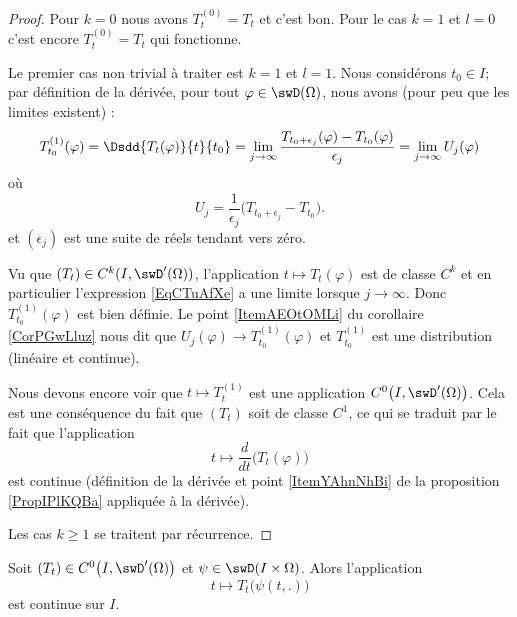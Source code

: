 \begin{proof}
    Pour \( k=0\) nous avons \( T^{(0)}_t=T_t\) et c'est bon. Pour le cas \( k=1\) et \( l=0\) c'est encore \( T_t^{(0)}=T_t\) qui fonctionne.

    Le premier cas non trivial à traiter est \( k=1\) et \( l=1\). Nous considérons \( t_0\in I\); par définition de la dérivée, pour tout \( \varphi\in\swD(\Omega)\), nous avons (pour peu que les limites existent) :
    \begin{equation}    \label{EqCTuAfXe}
        T^{(1)}_{t_0}(\varphi)=  \Dsdd{ T_t(\varphi) }{t}{t_0}=\lim_{j\to \infty} \frac{ T_{t_0+\epsilon_j}(\varphi)-T_{t_0}(\varphi) }{ \epsilon_j }= \lim_{j\to \infty} U_j(\varphi)
    \end{equation}
    où
    \begin{equation}
        U_j=\frac{1}{ \epsilon_j }\big( T_{t_0+\epsilon_j}-T_{t_0} \big).
    \end{equation}
    et \( (\epsilon_j)\) est une suite de réels tendant vers zéro.

    Vu que \( (T_t)\in C^k(I,\swD'(\Omega))\), l'application \( t\mapsto T_t(\varphi)\) est de classe \( C^k\) et en particulier l'expression \eqref{EqCTuAfXe} a une limite lorsque \( j\to \infty\). Donc \( T^{(1)}_{t_0}(\varphi)\) est bien définie. Le point \ref{ItemAEOtOMLi} du corollaire \ref{CorPGwLluz} nous dit que \( U_j(\varphi)\to T_{t_0}^{(1)}(\varphi)\) et \( T_{t_0}^{(1)}\) est une distribution (linéaire et continue).

    Nous devons encore voir que \( t\mapsto T^{(1)}_t\) est une application \( C^0\big( I,\swD'(\Omega) \big)\). Cela est une conséquence du fait que \( (T_t)\) soit de classe \( C^1\), ce qui se traduit par le fait que l'application
    \begin{equation}
        t\mapsto \frac{ d }{ dt }\Big( T_t(\varphi) \Big)
    \end{equation}
    est continue (définition de la dérivée et point \ref{ItemYAhnNhBi} de la proposition \ref{PropIPlKQBa} appliquée à la dérivée).

    Les cas \( k\geq 1\) se traitent par récurrence.
\end{proof}

\begin{proposition} \label{PropOTlWzog}
    Soit \( (T_t)\in C^0\big( I,\swD'(\Omega) \big)\) et \( \psi\in\swD(I\times \Omega)\). Alors l'application 
    \begin{equation}
        t\mapsto T_t\big( \psi(t,.) \big)
    \end{equation}
    est continue sur \( I\).
\end{proposition}

